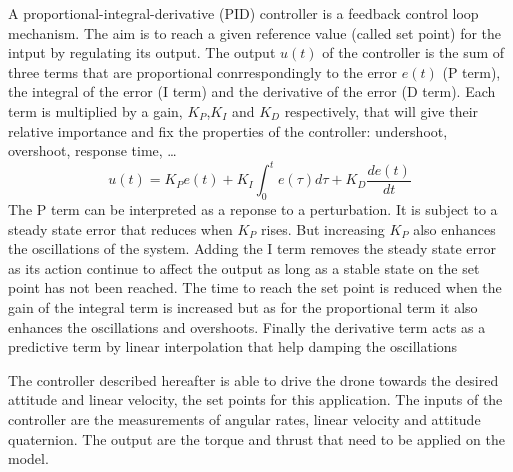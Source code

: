 A proportional-integral-derivative (PID) controller is a feedback control loop mechanism. The aim is to reach a given
reference value (called set point) for the intput by regulating its output. The output $u(t)$ of the controller is the
sum of three terms that are proportional conrrespondingly to the error $e(t)$ (P term), the integral of the error (I
term) and the derivative of the error (D term). Each term is multiplied by a gain, $K_P$,$K_I$ and $K_D$ respectively,
that will give their relative importance and fix the properties of the controller: undershoot, overshoot, response
time, \ldots
\begin{equation}
	u(t) = K_P e(t) + K_I\int_0^t{e(\tau)d\tau} + K_D \frac{de(t)}{dt}
\end{equation}
The P term can be interpreted as a reponse to a perturbation. It is subject to a steady state error that reduces when
$K_P$ rises. But increasing $K_P$ also enhances the oscillations of the system. Adding the I term removes the steady
state error as its action continue to affect the output as long as a stable state on the set point has not been
reached. The time to reach the set point is reduced when the gain of the integral term is increased but as for the
proportional term it also enhances the oscillations and overshoots. Finally the derivative term acts as a predictive
term by linear interpolation that help damping the oscillations



The controller described hereafter is able to drive the drone towards the desired attitude and linear velocity, the set
points for this application. The inputs of the controller are the measurements of angular rates, linear velocity and
attitude quaternion. The output are the torque and thrust that need to be applied on the model.  

